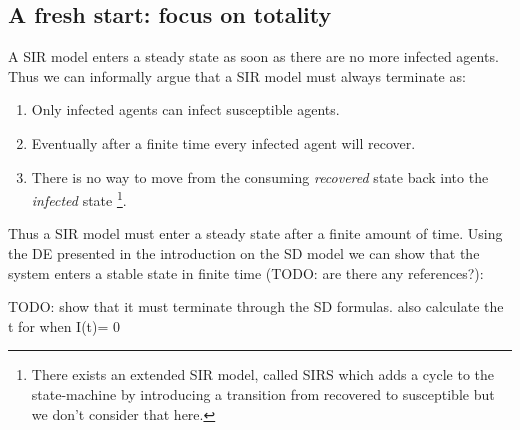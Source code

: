 
\subsection{A fresh start: focus on totality}
A SIR model enters a steady state as soon as there are no more infected agents. Thus we can informally argue that a SIR model must always terminate as:
\begin{enumerate}
	\item Only infected agents can infect susceptible agents.
	\item Eventually after a finite time every infected agent will recover.
	\item There is no way to move from the consuming \textit{recovered} state back into the \textit{infected} state \footnote{There exists an extended SIR model, called SIRS which adds a cycle to the state-machine by introducing a transition from recovered to susceptible but we don't consider that here.}.
\end{enumerate}

Thus a SIR model must enter a steady state after a finite amount of time. Using the DE presented in the introduction on the SD model we can show that the system enters a stable state in finite time (TODO: are there any references?):

TODO: show that it must terminate through the SD formulas. also calculate the t for when I(t)= 0

